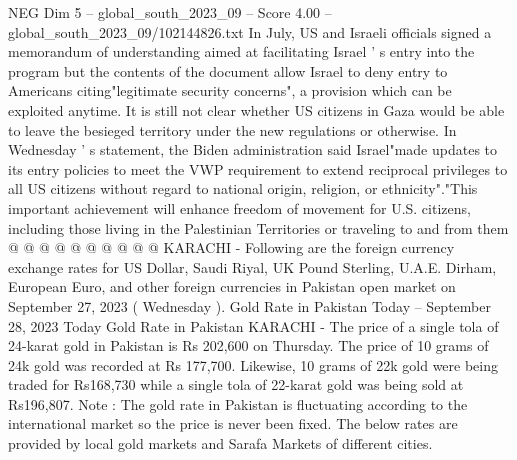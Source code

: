 \begin{textsample}{NEG Dim 5 – global\_south\_2023\_09 – Score 4.00 – global\_south\_2023\_09/102144826.txt}
In July, US and Israeli officials signed a memorandum of understanding aimed at facilitating Israel ' s entry into the program but the contents of the document allow Israel to deny entry to Americans citing"legitimate security concerns", a provision which can be exploited anytime.
It is still not clear whether US citizens in Gaza would be able to leave the besieged territory under the new regulations or otherwise.
In Wednesday ' s statement, the Biden administration said Israel"made updates to its entry policies to meet the VWP requirement to extend reciprocal privileges to all US citizens without regard to national origin, religion, or ethnicity"."This important achievement will enhance freedom of movement for U.S. citizens, including those living in the Palestinian Territories or traveling to and from them @ @ @ @ @ @ @ @ @ @ KARACHI - Following are the foreign currency exchange rates for US Dollar, Saudi Riyal, UK Pound Sterling, U.A.E.
Dirham, European Euro, and other foreign currencies in Pakistan open market on September 27, 2023 ( Wednesday ).
Gold Rate in Pakistan Today -- September 28, 2023 Today Gold Rate in Pakistan KARACHI - The price of a single tola of 24-karat gold in Pakistan is Rs 202,600 on Thursday.
The price of 10 grams of 24k gold was recorded at Rs 177,700.
Likewise, 10 grams of 22k gold were being traded for Rs168,730 while a single tola of 22-karat gold was being sold at Rs196,807.
Note : The gold rate in Pakistan is fluctuating according to the international market so the price is never been fixed.
The below rates are provided by local gold markets and Sarafa Markets of different cities.

\end{textsample}
